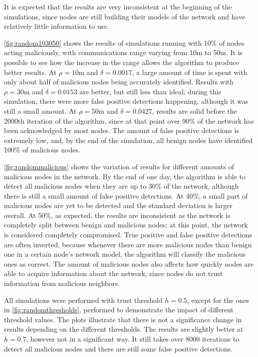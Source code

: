 It is expected that the results are very inconsistent at the beginning of the simulations, since nodes are still building their models of the network and have relatively little information to use.

\autoref{fig:random103050} shows the results of simulations running with 10\% of nodes acting maliciously, with communications range varying from 10m to 50m.
It is possible to see how the increase in the range allows the algorithm to produce better results.
At $\rho = 10$m and $\delta = 0.0017$, a large amount of time is spent with only about half of malicious nodes being accurately identified.
Results with $\rho = 30$m and $\delta = 0.0153$ are better, but still less than ideal; during this simulation, there were more false positive detections happening, although it was still a small amount.
At $\rho = 50$m and $\delta = 0.0427$, results are solid before the 2000th iteration of the algorithm, since at that point over 90\% of the network has been acknowledged by most nodes.
The amount of false positive detections is extremely low, and, by the end of the simulation, all benign nodes have identified 100\% of malicious nodes.


\autoref{fig:randommalicious} shows the variation of results for different amounts of malicious nodes in the network.
By the end of one day, the algorithm is able to detect all malicious nodes when they are up to 30\% of the network, although there is still a small amount of false positive detections.
At 40\%, a small part of malicious nodes are yet to be detected and the standard deviation is larger overall.
At 50\%, as expected, the results are inconsistent as the network is completely split between benign and malicious nodes; at this point, the network is considered completely compromised.
True positive and false positive detections are often inverted, because whenever there are more malicious nodes than benign one in a certain node's network model, the algorithm will classify the malicious ones as correct.
The amount of malicious nodes also affects how quickly nodes are able to acquire information about the network, since nodes do not trust information from malicious neighbors.

All simulations were performed with trust threshold $h=0.5$, except for the ones in \autoref{fig:randomthresholds}, performed to demonstrate the impact of different threshold values.
The plots illustrate that there is not a significance change in results depending on the different thresholds.
The results are slightly better at $h=0.7$, however not in a significant way.
It still takes over 8000 iterations to detect all malicious nodes and there are still some false positive detections.


